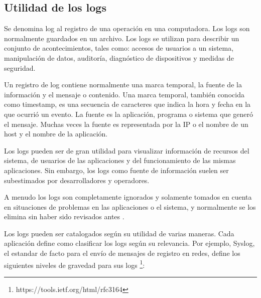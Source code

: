 \subsection{Utilidad de los logs}
\label{utilidad_de_los_logs}
Se denomina log al registro de una operación en una computadora. Los logs son
normalmente guardados en un archivo. Los logs se utilizan para describir un
conjunto de acontecimientos, tales como: accesos de usuarios a un sistema,
manipulación de datos, auditoría, diagnóstico de dispositivos y medidas de
seguridad.

Un registro de log contiene normalmente una marca temporal, la fuente de la
información y el mensaje o contenido. Una marca temporal, también conocida como
timestamp, es una secuencia de caracteres que indica la hora y fecha en la que
ocurrió un evento. La fuente es la aplicación, programa o sistema que generó el
mensaje. Muchas veces la fuente es representada por la IP o el nombre de un
host y el nombre de la aplicación.

Los logs pueden ser de gran utilidad para visualizar información de recursos
del sistema, de usuarios de las aplicaciones y del funcionamiento de las mismas
aplicaciones. Sin embargo, los logs como fuente de información suelen ser
subestimados por desarrolladores y operadores.

A menudo los logs son completamente ignorados y solamente tomados en cuenta en
situaciones de problemas en las aplicaciones o el sistema, y normalmente se los
elimina sin haber sido revisados antes
\cite[p.~16]{monitoreo:logging_and_log_management}.

Los logs pueden ser catalogados según su utilidad de varias maneras. Cada
aplicación define como clasificar los logs según su relevancia. Por ejemplo,
Syslog, el estandar de facto para el envío de mensajes de registro en redes,
define los siguientes niveles de gravedad para sus logs
\footnote{https://tools.ietf.org/html/rfc3164}:

